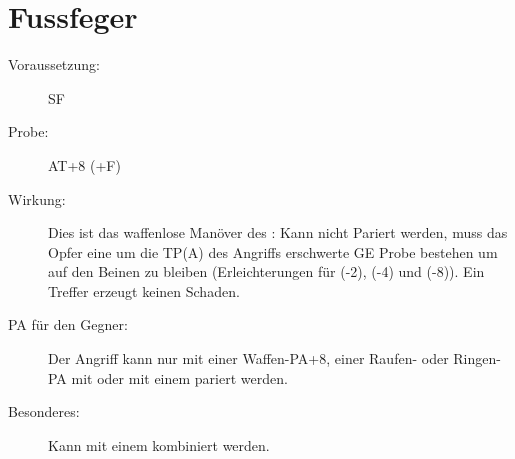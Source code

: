 \section{Fussfeger}
\label{uAT.fussfeger}
\begin{description}
    \item[Voraussetzung:]
        SF 
    \item[Probe:]
        AT+8 (+F)
    \item[Wirkung:]
        Dies ist das waffenlose Manöver des :
        Kann nicht Pariert werden, muss das Opfer eine um die TP(A) des Angriffs erschwerte GE Probe bestehen um auf den Beinen zu bleiben (Erleichterungen für  (-2),  (-4) und  (-8)).
        Ein Treffer erzeugt keinen Schaden. 
    \item[PA für den Gegner:]
        Der Angriff kann nur mit einer Waffen-PA+8, einer Raufen- oder Ringen-PA mit  oder mit einem  pariert werden.
    \item[Besonderes:]
        Kann mit einem  kombiniert werden.
\end{description}

